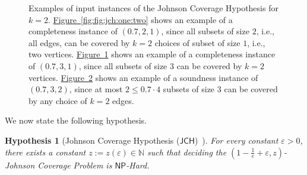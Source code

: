 \documentclass[10pt,a4paper]{amsart}
\newtheorem{hypothesis}[theorem]{Hypothesis}
\newcommand{\namedref}[2]{\hyperref[#2]{#1~\ref*{#2}}}
\newcommand{\figlab}[1]{\label{fig:#1}}
\newcommand{\figref}[1]{\namedref{Figure}{fig:#1}}
\newcommand{\hyplab}[1]{\label{hyp:#1}}
\newcommand{\JCH}{$\mathsf{JCH}$\xspace}
\newcommand{\NP}{$\mathsf{NP}$\xspace}
\begin{document}
\begin{figure}[!htb]
\begin{subfigure}[b]{0.3\textwidth}
\caption{}
\figlab{fig:jch:one:three}
\end{subfigure}
\begin{subfigure}[b]{0.3\textwidth}
\centering
{}
\caption{}
\figlab{fig:jch:two:three}
\end{subfigure}
\caption{Examples of input instances of the Johnson Coverage Hypothesis for $k=2$. 
\figref{fig:jch:one:two} shows an example of a completeness instance of $\left(0.7,2,1\right)$, since all subsets of size $2$, i.e., all edges, can be covered by $k=2$ choices of subset of size $1$, i.e., two vertices.
\figref{fig:jch:one:three} shows an example of a completeness instance of $\left(0.7,3,1\right)$, since all subsets of size $3$ can be covered by $k=2$ vertices. 
\figref{fig:jch:two:three} shows an example of a soundness instance of $\left(0.7,3,2\right)$, since at most $2\le 0.7\cdot 4$ subsets of size $3$ can be covered by any choice of $k=2$ edges.  
}
\figlab{fig:jch}
\end{figure}

We now state the following hypothesis. 

\begin{hypothesis}[Johnson Coverage Hypothesis (\JCH)~\cite{Cohen-AddadSL22}]\hyplab{hyp:jch}
For every constant $\varepsilon>0$, there exists a constant $z:=z(\varepsilon)\in\mathbb{N}$ such that deciding the $\left(1-\frac{1}{e}+\varepsilon,z\right)$-Johnson Coverage Problem is \NP-Hard. 
\end{hypothesis}
\end{document}
